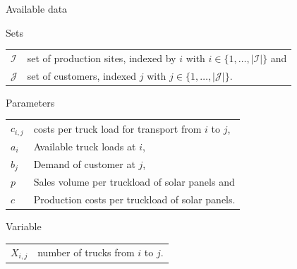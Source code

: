 \documentclass[aspectratio=1610,12pt]{beamer}
\begin{document}
\begin{frame}[fragile]{Available data}
\begin{block}{Sets}
\vspace{0.1cm}
	\begin{tabular}{ll}
		$\mathcal{I}$  	& set of production sites, indexed by $i$ with $i \in \{1,\ldots,|\mathcal{I}|\}$ and\\
    	$\mathcal{J}$ 	& set of customers, indexed $j$ with $j \in \{1, \ldots, |\mathcal{J}|\}$.\\
	\end{tabular}
\end{block}
\begin{block}{Parameters}
\vspace{0.1cm}
	\begin{tabular}{ll}
		$c_{i,j}$  & costs per truck load for transport from $i$ to $j$,\\
    	$a_i$ 	  & Available truck loads at $i$,\\
    	$b_j$ 	  & Demand of customer at $j$,\\
    	\alert{$p$} & Sales volume per truckload of solar panels and\\
    	\alert{$c$} & Production costs per truckload of solar panels.
\end{tabular}
\end{block}
\begin{block}{Variable}
\vspace{0.1cm}
	\begin{tabular}{ll}
		$X_{i,j}$ & number of trucks from $i$ to $j$. \\
\end{tabular}
\end{block}
\end{frame}
\end{document}
